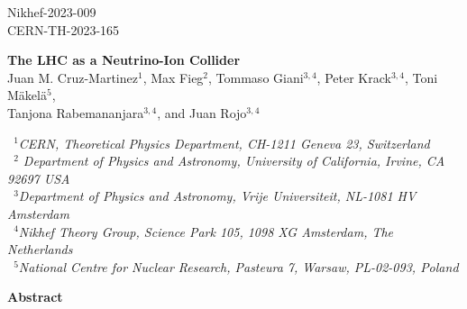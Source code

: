 \documentclass[11pt,a4paper]{article}
\numberwithin{equation}{section}
\numberwithin{figure}{section}
\numberwithin{table}{section}
\begin{document}

\vspace{-2.0cm}
\begin{flushright}
Nikhef-2023-009 \\ CERN-TH-2023-165\\
\end{flushright}
\vspace{0.6cm}

\begin{center}
  {\Large \bf The LHC as a Neutrino-Ion Collider }\\
  \vspace{1.1cm}
  {\small
    Juan M. Cruz-Martinez$^{1}$, Max Fieg$^{2}$, Tommaso Giani$^{3,4}$, Peter Krack$^{3,4}$, Toni M\"akel\"a$^{5}$,  \\[0.1cm]
    Tanjona Rabemananjara$^{3,4}$, and Juan Rojo$^{3,4}$
  }\\
  
\vspace{0.7cm}

{\it \small
    ~$^1$CERN, Theoretical Physics Department, CH-1211 Geneva 23, Switzerland \\[0.1cm]
    ~$^2$ Department of Physics and Astronomy, University of California, Irvine, CA 92697 USA  \\[0.1cm]
    ~$^3$Department of Physics and Astronomy, Vrije Universiteit, NL-1081 HV Amsterdam\\[0.1cm]
    ~$^4$Nikhef Theory Group, Science Park 105, 1098 XG Amsterdam, The Netherlands\\[0.1cm]
    ~$^5$National Centre for Nuclear Research, Pasteura 7, Warsaw, PL-02-093, Poland \\[0.1cm]
 }

\vspace{1.0cm}

{\bf \large Abstract}

\end{center}
\end{document}
